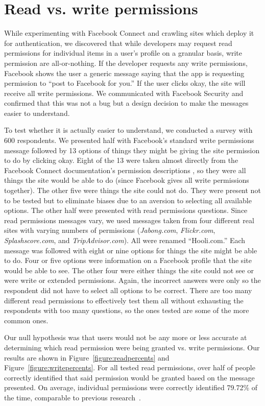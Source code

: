 \documentclass[twoside,letterpaper]{soups-poster}
\begin{document}
\section{Read vs. write permissions}

While experimenting with Facebook Connect and crawling sites which deploy it for authentication, we discovered that while developers may request read permissions for individual items in a user's profile on a granular basis, write permission are all-or-nothing.
If the developer requests any write permissions, Facebook shows the user a generic message saying that the app is requesting permission to ``post to Facebook for you.'' If the user clicks okay, the site will receive all write permissions.
We communicated with Facebook Security and confirmed that this was not a bug but a design decision to make the messages easier to understand.

To test whether it is actually easier to understand, we conducted a survey with 600 respondents.
We presented half with Facebook's standard write permissions message followed by 13 options of things they might be giving the site permission to do by clicking okay. Eight of the 13 were taken almost directly from the Facebook Connect documentation's permission descriptions \cite{fbpermissions}, so they were all things the site would be able to do (since Facebook gives all write permissions together). The other five were things the site could not do. They were present not to be tested but to eliminate biases due to an aversion to selecting all available options. 
The other half were presented with read permissions questions.
Since read permissions messages vary, we used messages taken from four different real sites with varying numbers of permissions (\emph{Jabong.com}, \emph{Flickr.com}, \emph{Splashscore.com}, and \emph{TripAdvisor.com}).
All were renamed ``Hooli.com.''
Each message was followed with eight or nine options for things the site might be able to do. Four or five options were information on a Facebook profile that the site would be able to see. The other four were either things the site could not see or were write or extended permissions. Again, the incorrect answers were only so the respondent did not have to select all options to be correct. There are too many different read permissions to effectively test them all without exhausting the respondents with too many questions, so the ones tested are some of the more common ones.

Our null hypothesis was that users would not be any more or less accurate at determining which read permission were being granted vs. write permissions.
Our results are shown in Figure~\ref{figure:readpercents} and Figure~\ref{figure:writepercents}. 
For all tested read permissions, over half of people correctly identified that said permission would be granted based on the message presented.
On average, individual permissions were correctly identified 79.72\% of the time, comparable to previous research~\cite{egelman}.
\end{document}
